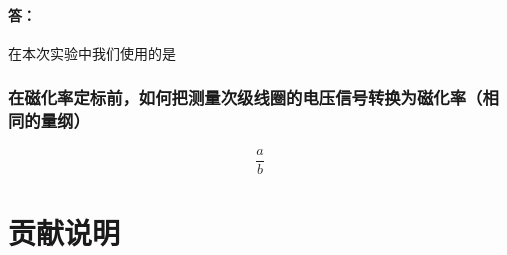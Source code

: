 \documentclass{ctexart}
\theoremstyle{ansstyle}
\begin{document}
\paragraph{答：} 在本次实验中我们使用的是
\subsubsection{在磁化率定标前，如何把测量次级线圈的电压信号转换为磁化率（相同的量纲）}




\appendix
\begin{equation}
    \dfrac{a}{b}
\end{equation}

\section{贡献说明}
\end{document}
